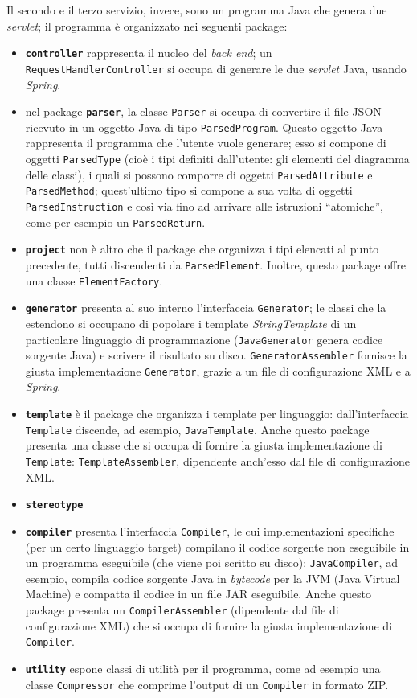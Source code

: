 Il secondo e il terzo servizio, invece, sono un programma Java che genera due \emph{servlet}; il programma è organizzato nei seguenti package:
\begin{itemize}
	\item \textbf{\texttt{controller}} rappresenta il nucleo del \emph{back end}; un \texttt{RequestHandlerController} si occupa di generare le due \emph{servlet} Java, usando \emph{Spring}.
	\item nel package \textbf{\texttt{parser}}, la classe \texttt{Parser} si occupa di convertire il file JSON ricevuto in un oggetto Java di tipo \texttt{ParsedProgram}. Questo oggetto Java rappresenta il programma che l'utente vuole generare; esso si compone di oggetti \texttt{ParsedType} (cioè i tipi definiti dall'utente: gli elementi del diagramma delle classi), i quali si possono comporre di oggetti \texttt{ParsedAttribute} e \texttt{ParsedMethod}; quest'ultimo tipo si compone a sua volta di oggetti \texttt{ParsedInstruction} e così via fino ad arrivare alle istruzioni “atomiche”, come per esempio un \texttt{ParsedReturn}.
	\item \textbf{\texttt{project}} non è altro che il package che organizza i tipi elencati al punto precedente, tutti discendenti da \texttt{ParsedElement}. Inoltre, questo package offre una classe \texttt{ElementFactory}. %
	\item \textbf{\texttt{generator}} presenta al suo interno l'interfaccia \texttt{Generator}; le classi che la estendono si occupano di popolare i template \emph{StringTemplate} di un particolare linguaggio di programmazione (\texttt{JavaGenerator} genera codice sorgente Java) e scrivere il risultato su disco. \texttt{GeneratorAssembler} fornisce la giusta implementazione \texttt{Generator}, grazie a un file di configurazione XML e a \emph{Spring}.
	\item \textbf{\texttt{template}} è il package che organizza i template per linguaggio: dall'interfaccia \texttt{Template} discende, ad esempio, \texttt{JavaTemplate}. Anche questo package presenta una classe che si occupa di fornire la giusta implementazione di \texttt{Template}: \texttt{TemplateAssembler}, dipendente anch'esso dal file di configurazione XML.
	\item \textbf{\texttt{stereotype}} %
	\item \textbf{\texttt{compiler}} presenta l'interfaccia \texttt{Compiler}, le cui implementazioni specifiche (per un certo linguaggio target) compilano il codice sorgente non eseguibile in un programma eseguibile (che viene poi scritto su disco); \texttt{JavaCompiler}, ad esempio, compila codice sorgente Java in \emph{bytecode} per la JVM (Java Virtual Machine) e compatta il codice in un file JAR eseguibile. Anche questo package presenta un \texttt{CompilerAssembler} (dipendente dal file di configurazione XML) che si occupa di fornire la giusta implementazione di \texttt{Compiler}.
	\item \textbf{\texttt{utility}} espone classi di utilità per il programma, come ad esempio una classe \texttt{Compressor} che comprime l'output di un \texttt{Compiler} in formato ZIP. %
\end{itemize}

